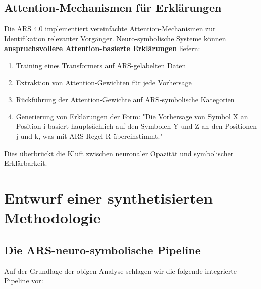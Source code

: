 \documentclass[12pt,a4paper]{article}
\begin{document}
\subsection{Attention-Mechanismen für Erklärungen}

Die ARS 4.0 implementiert vereinfachte Attention-Mechanismen zur Identifikation 
relevanter Vorgänger. Neuro-symbolische Systeme können \textbf{anspruchsvollere 
Attention-basierte Erklärungen} liefern:

\begin{enumerate}
    \item Training eines Transformers auf ARS-gelabelten Daten
    \item Extraktion von Attention-Gewichten für jede Vorhersage
    \item Rückführung der Attention-Gewichte auf ARS-symbolische Kategorien
    \item Generierung von Erklärungen der Form: "Die Vorhersage von Symbol X an 
    Position i basiert hauptsächlich auf den Symbolen Y und Z an den Positionen 
    j und k, was mit ARS-Regel R übereinstimmt."
\end{enumerate}

Dies überbrückt die Kluft zwischen neuronaler Opazität und symbolischer Erklärbarkeit.

\section{Entwurf einer synthetisierten Methodologie}

\subsection{Die ARS-neuro-symbolische Pipeline}

Auf der Grundlage der obigen Analyse schlagen wir die folgende integrierte 
Pipeline vor:
\end{document}
